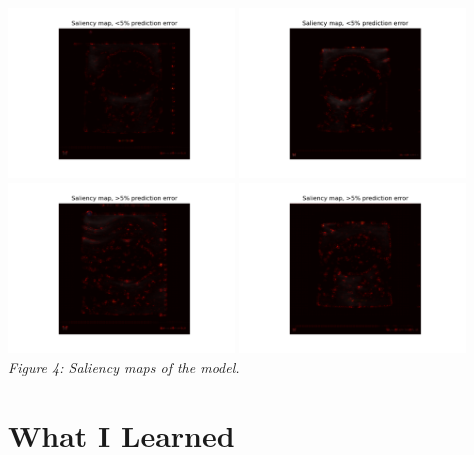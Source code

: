 \documentclass{article}[12pt]
\begin{document}
\begin{center}
    \includegraphics[width=0.45\textwidth]{images/saliency_correct.pdf}
    \includegraphics[width=0.45\textwidth]{images/saliency_correct2.pdf}\\
    \includegraphics[width=0.45\textwidth]{images/saliency_incorrect.pdf}
    \includegraphics[width=0.45\textwidth]{images/saliency_incorrect2.pdf}\\
    \textit{Figure 4: Saliency maps of the model.}
\end{center}

\section*{What I Learned}
\end{document}

